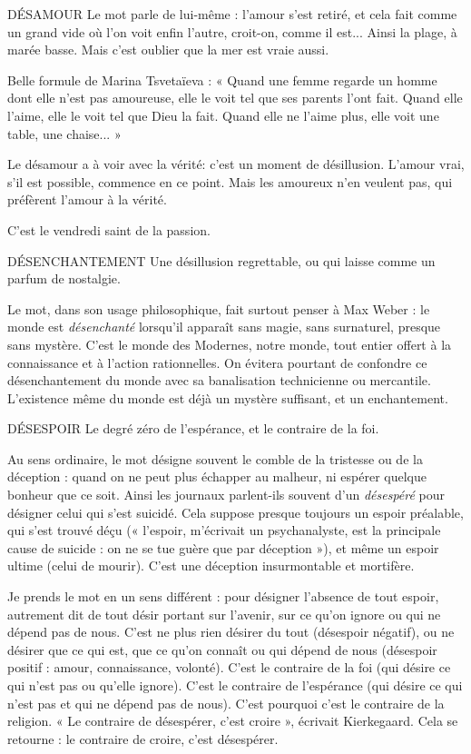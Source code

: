DÉSAMOUR Le mot parle de lui-même : l'amour s’est retiré, et cela fait
comme un grand vide où l’on voit enfin l’autre, croit-on,
comme il est... Ainsi la plage, à marée basse. Mais c’est oublier que la mer est
vraie aussi.

Belle formule de Marina Tsvetaïeva : « Quand une femme regarde un
homme dont elle n’est pas amoureuse, elle le voit tel que ses parents l’ont fait.
Quand elle l’aime, elle le voit tel que Dieu la fait. Quand elle ne l'aime plus,
elle voit une table, une chaise... »

Le désamour a à voir avec la vérité: c’est un moment de désillusion.
L'amour vrai, s’il est possible, commence en ce point. Mais les amoureux n’en
veulent pas, qui préfèrent l’amour à la vérité.

C’est le vendredi saint de la passion.

DÉSENCHANTEMENT Une désillusion regrettable, ou qui laisse comme
un parfum de nostalgie.

Le mot, dans son usage philosophique, fait surtout penser à Max Weber :
le monde est {\it désenchanté} lorsqu'il apparaît sans magie, sans surnaturel, presque
sans mystère. C’est le monde des Modernes, notre monde, tout entier offert à
la connaissance et à l’action rationnelles. On évitera pourtant de confondre ce
désenchantement du monde avec sa banalisation technicienne ou mercantile.
L'existence même du monde est déjà un mystère suffisant, et un enchantement.

DÉSESPOIR Le degré zéro de l'espérance, et le contraire de la foi.

Au sens ordinaire, le mot désigne souvent le comble de la tristesse ou de la
déception : quand on ne peut plus échapper au malheur, ni espérer quelque
bonheur que ce soit. Ainsi les journaux parlent-ils souvent d’un {\it désespéré} pour
désigner celui qui s’est suicidé. Cela suppose presque toujours un espoir préalable,
qui s’est trouvé déçu (« l'espoir, m’écrivait un psychanalyste, est la principale
cause de suicide : on ne se tue guère que par déception »), et même un
espoir ultime (celui de mourir). C’est une déception insurmontable et mortifère.

Je prends le mot en un sens différent : pour désigner l’absence de tout
espoir, autrement dit de tout désir portant sur l'avenir, sur ce qu’on ignore ou
qui ne dépend pas de nous. C’est ne plus rien désirer du tout (désespoir
négatif), ou ne désirer que ce qui est, que ce qu’on connaît ou qui dépend de
nous (désespoir positif : amour, connaissance, volonté). C’est le contraire de la
foi (qui désire ce qui n’est pas ou qu’elle ignore). C’est le contraire de l’espérance
(qui désire ce qui n’est pas et qui ne dépend pas de nous). C’est pourquoi
c’est le contraire de la religion. « Le contraire de désespérer, c’est croire », écrivait
Kierkegaard. Cela se retourne : le contraire de croire, c’est désespérer.

